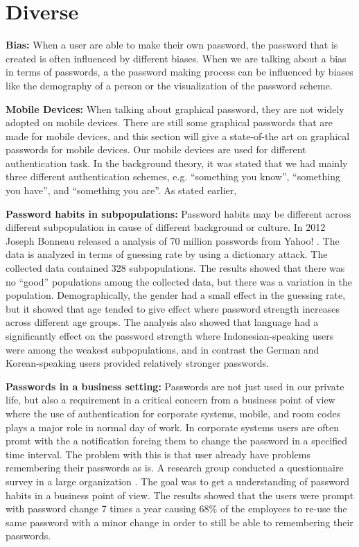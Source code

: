 \section{Diverse}

  {\bf Bias:} When a user are able to make their own password, the password that is created is often influenced by different biases.  When we are talking about a bias in terms of passwords, a the password making process can be influenced by biases like the demography of a person or the visualization of the password scheme. 
    
  {\bf Mobile Devices: } When talking about graphical password, they are not widely adopted on mobile devices. There are still some graphical passwords that are made for mobile devices, and this section will give a state-of-the art on graphical passwords for mobile devices.
  Our mobile devices are used for different authentication task. In the background theory, it was stated that we had mainly three different authentication schemes, e.g. ``something you know'', ``something you have'', and ``something you are''.
  As stated earlier, 

  {\bf Password habits in subpopulations:} Password habits may be different across different subpopulation in cause of different background or culture. In 2012 Joseph Bonneau released a analysis of 70 million passwords from Yahoo! \cite{Bonneau2}. The data is analyzed in terms of guessing rate by using a dictionary attack. The collected data contained 328 subpopulations. The results showed that there was no ``good'' populations among the collected data, but there was a variation in the population. Demographically, the gender had a small effect in the guessing rate, but it showed that age tended to give effect where password strength increases across different age groups. The analysis also showed that language had a significantly effect on the password strength where Indonesian-speaking users were among the weakest subpopulations, and in contrast the German and Korean-speaking users provided relatively stronger passwords. 

  {\bf Passwords in a business setting:} Passwords are not just used in our private life, but also a requirement in a critical concern from a business point of view where the use of authentication for corporate systems, mobile, and room codes plays a major role in normal day of work. In corporate systems users are often promt with the a notification forcing them to change the password in a specified time interval. The problem with this is that user already have problems remembering their passwords as is. A research group conducted a questionnaire survey in a large organization \cite{habits2}. The goal was to get a understanding of password habits in a business point of view. The results showed that the users were prompt with password change 7 times a year causing 68\% of the employees to re-use the same password with a minor change in order to still be able to remembering their passwords.

